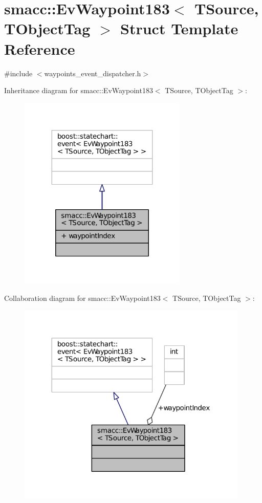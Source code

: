 \hypertarget{structsmacc_1_1EvWaypoint183}{}\section{smacc\+:\+:Ev\+Waypoint183$<$ T\+Source, T\+Object\+Tag $>$ Struct Template Reference}
\label{structsmacc_1_1EvWaypoint183}


{\ttfamily \#include $<$waypoints\+\_\+event\+\_\+dispatcher.\+h$>$}



Inheritance diagram for smacc\+:\+:Ev\+Waypoint183$<$ T\+Source, T\+Object\+Tag $>$\+:
\nopagebreak
\begin{figure}[H]
\begin{center}
\leavevmode
\includegraphics[width=227pt]{structsmacc_1_1EvWaypoint183__inherit__graph}
\end{center}
\end{figure}


Collaboration diagram for smacc\+:\+:Ev\+Waypoint183$<$ T\+Source, T\+Object\+Tag $>$\+:
\nopagebreak
\begin{figure}[H]
\begin{center}
\leavevmode
\includegraphics[width=312pt]{structsmacc_1_1EvWaypoint183__coll__graph}
\end{center}
\end{figure}
